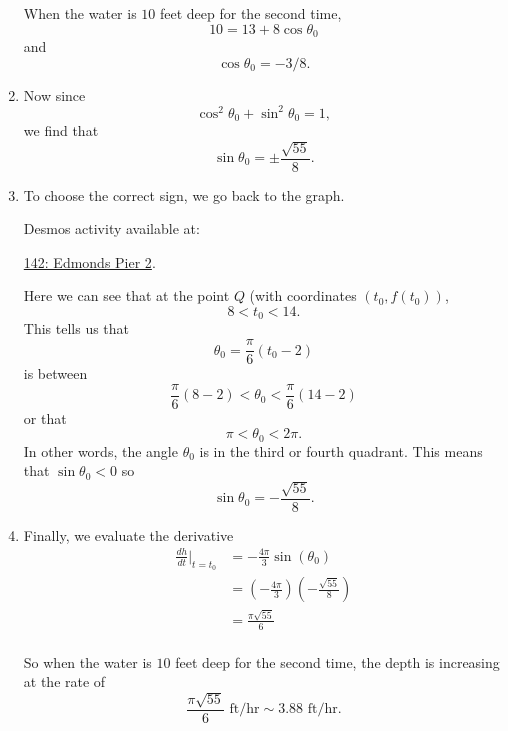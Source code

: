 \documentclass{ximera}
\begin{document}
\begin{example}
\begin{enumerate}
When the water is $10$ feet deep for the second time,
\[
  10 = 13 + 8\cos \theta_0 
\]
and
\[
   \cos\theta_0 = -3/8 .
\]

\item Now since
\[
     \cos^2\theta_0 + \sin^2\theta_0 = 1 ,
\]
we find that
\[
    \sin\theta_0 = \pm \frac{\sqrt{55}}{8} .
\]

\item To choose the correct sign, we go back to the graph.

Desmos activity available at:

\href{https://www.desmos.com/calculator/fs9xy1lf0e}{142: Edmonds Pier 2}.

 
\begin{onlineOnly}
    \begin{center}
\end{center}
\end{onlineOnly}

Here we can see that at the point $Q$ (with coordinates $(t_0, f(t_0))$, 
\[
          8 < t_0 < 14.
\]  
This tells us that 
\[
 \theta_ 0 =  \frac{\pi}{6} \left( t_0 - 2 \right)
\]
is between
\[
       \frac{\pi}{6} \left(8 - 2 \right)  <   \theta_0  < \frac{\pi}{6} \left(14 - 2 \right)
\]
or that
\[
     \pi < \theta_0 < 2\pi .
\]  
In other words, the angle $\theta_0$ is in the third or fourth quadrant. This means that $\sin\theta_0 < 0$ so 
\[
 \sin\theta_0 = - \frac{\sqrt{55}}{8} .
\]

\item Finally, we evaluate the derivative
\begin{align*}
 \frac{dh}{dt}\Big|_{t=t_0} &=-\frac{4\pi}{3} \sin\left( \theta_0   \right)  \\
                                         & = \left(- \frac{4\pi}{3}\right)  \left( - \frac{\sqrt{55}}{8} \right) \\
                                        &= \frac{\pi \sqrt{55}}{6} \\
\end{align*}

So when the water is $10$ feet deep for the second time, the depth is increasing at the rate of 
\[
  \frac{\pi \sqrt{55}}{6} \text{ ft/hr} \sim 3.88\text{ ft/hr} .
\]

\end{enumerate}
\end{example}
\end{document}
